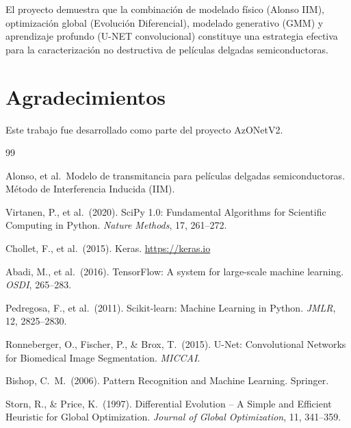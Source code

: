 \documentclass{article}
\begin{document}
El proyecto demuestra que la combinación de modelado físico (Alonso IIM), optimización global (Evolución Diferencial), modelado generativo (GMM) y aprendizaje profundo (U-NET convolucional) constituye una estrategia efectiva para la caracterización no destructiva de películas delgadas semiconductoras.

\section*{Agradecimientos}
Este trabajo fue desarrollado como parte del proyecto AzONetV2.

\begin{thebibliography}{99}

 Alonso, et al.\ Modelo de transmitancia para películas delgadas semiconductoras. Método de Interferencia Inducida (IIM).

 Virtanen, P., et al.\ (2020). SciPy 1.0: Fundamental Algorithms for Scientific Computing in Python. \textit{Nature Methods}, 17, 261--272.

 Chollet, F., et al.\ (2015). Keras. \url{https://keras.io}

 Abadi, M., et al.\ (2016). TensorFlow: A system for large-scale machine learning. \textit{OSDI}, 265--283.

 Pedregosa, F., et al.\ (2011). Scikit-learn: Machine Learning in Python. \textit{JMLR}, 12, 2825--2830.

 Ronneberger, O., Fischer, P., \& Brox, T.\ (2015). U-Net: Convolutional Networks for Biomedical Image Segmentation. \textit{MICCAI}.

 Bishop, C.\ M.\ (2006). Pattern Recognition and Machine Learning. Springer.

 Storn, R., \& Price, K.\ (1997). Differential Evolution -- A Simple and Efficient Heuristic for Global Optimization. \textit{Journal of Global Optimization}, 11, 341--359.

\end{thebibliography}
\end{document}
